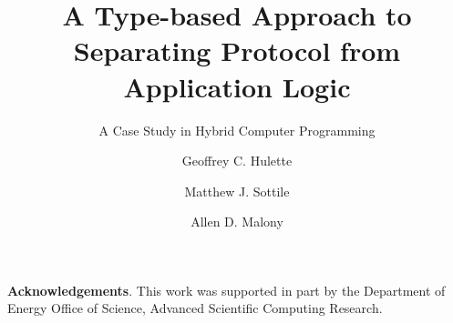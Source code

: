 \documentclass{llncs}
\begin{document}
\title{A Type-based Approach to Separating Protocol from Application Logic}
\subtitle{A Case Study in Hybrid Computer Programming}

\author{
Geoffrey C. Hulette \and 
Matthew J. Sottile \and 
Allen D. Malony
}

\maketitle












\vspace{10pt}
\noindent\textbf{Acknowledgements}. This work was supported in
part by the Department of Energy Office of Science, Advanced
Scientific Computing Research.



\end{document}
